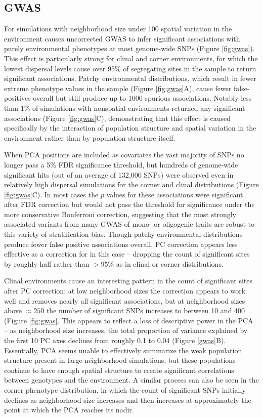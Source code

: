 \documentclass[10pt,twoside,lineno]{gsajnl}
\begin{document}
\subsection{GWAS}
For simulations with neighborhood size under 100 spatial variation in the environment causes uncorrected GWAS to infer significant associations with purely environmental phenotypes at most genome-wide SNPs (Figure \ref{fig:gwas}). This effect is particularly strong for clinal and corner environments, for which the lowest dispersal levels cause over 95\% of segregating sites in the sample to return significant associations. Patchy environmental distributions, which result in fewer extreme phenotype values in the sample (Figure \ref{fig:gwas}A), cause fewer false-positives overall but still produce up to 1000 spurious associations. Notably less than 1\% of simulations with nonspatial environments returned any significant associations (Figure \ref{fig:gwas}C), demonstrating that this effect is caused specifically by the interaction of population structure and spatial variation in the environment rather than by population structure itself.  

When PCA positions are included as covariates the vast majority of SNPs no longer pass a 5\% FDR significance threshold, but hundreds of genome-wide significant hits (out of an average of 132,000 SNPs) were observed even in relatively high dispersal simulations for the corner and clinal distributions (Figure \ref{fig:gwas}C). In most cases the $p$ values for these associations were significant after FDR correction but would not pass the threshold for significance under the more conservative Bonferroni correction, suggesting that the most strongly associated variants from many GWAS of mono- or oligogenic traits are robust to this variety of stratification bias. Though patchy environmental distributions produce fewer false positive associations overall, PC correction appears less effective as a correction for in this case -- dropping the count of significant sites by roughly half rather than $>95\%$ as in clinal or corner distributions. 

Clinal environments cause an interesting pattern in the count of significant sites after PC correction: at low neighborhood sizes the correction appears to work well and removes nearly all significant associations, but at neighborhood sizes above $\approx250$ the number of significant SNPs increases to between 10 and 400 (Figure \ref{fig:gwas}. This appears to reflect a loss of descriptive power in the PCA -- as neighborhood size increases, the total proportion of variance explained by the first 10 PC axes declines from roughly 0.1 to 0.04 (Figure \ref{gwas}B). Essentially, PCA seems unable to effectively summarize the weak population structure present in large-neighborhood simulations, but these populations continue to have enough spatial structure to create significant correlations between genotypes and the environment. A similar process can also be seen in the corner phenotype distribution, in which the count of significant SNPs initially declines as neighborhood size increases and then increases at approximately the point at which the PCA reaches its nadir. 
\end{document}
